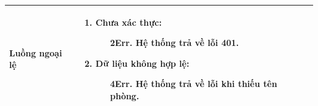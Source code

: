 {\begin{tabularx}{\textwidth}{|>{\raggedright\arraybackslash}p{3.5cm}|>{\raggedright\arraybackslash}X|}
\hline
\textbf{Luồng ngoại lệ} &
\begin{enumerate}
    \item \textbf{Chưa xác thực:}
    \begin{enumerate}
        \item[2Err.] Hệ thống trả về lỗi 401.
    \end{enumerate}
    \item \textbf{Dữ liệu không hợp lệ:}
    \begin{enumerate}
        \item[4Err.] Hệ thống trả về lỗi khi thiếu tên phòng.
    \end{enumerate}
\end{enumerate} \\
\hline
\end{tabularx}
}
